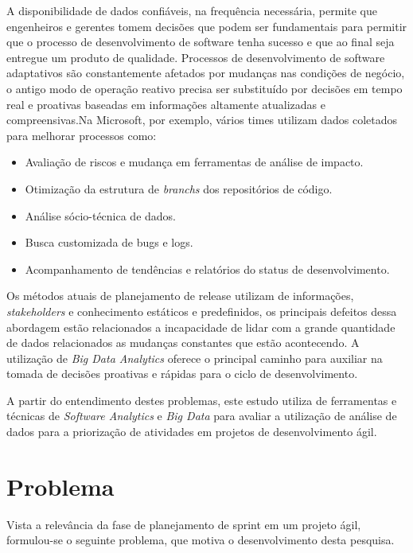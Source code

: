 A disponibilidade de dados confiáveis, na frequência necessária, permite que
engenheiros e gerentes tomem decisões que podem ser fundamentais para permitir
que o processo de desenvolvimento de software tenha sucesso e que ao final seja
entregue um produto de qualidade\cite{codemine}. Processos de desenvolvimento
de software adaptativos são constantemente afetados por mudanças nas condições
de negócio, o antigo modo de operação reativo precisa ser substituído por decisões
em tempo real e proativas baseadas em informações altamente atualizadas e
compreensivas\cite{artAndScience}.Na Microsoft, por exemplo, vários times utilizam
dados coletados para melhorar processos como:

\begin{itemize}
    \item Avaliação de riscos e mudança em ferramentas de análise de impacto.
    \item Otimização da estrutura de \textit{branchs} dos repositórios de código.
    \item Análise sócio-técnica de dados.
    \item Busca customizada de bugs e logs.
    \item Acompanhamento de tendências e relatórios do status de desenvolvimento.
\end{itemize}

Os métodos atuais de planejamento de release utilizam de informações, \textit{stakeholders}
e conhecimento estáticos e predefinidos, os principais defeitos dessa abordagem
estão relacionados a incapacidade de lidar com a grande quantidade de dados
relacionados as mudanças constantes que estão acontecendo. A utilização de
\textit{Big Data Analytics} oferece o principal caminho para auxiliar na tomada
de decisões proativas e rápidas para o ciclo de desenvolvimento\cite{artAndScience}.

A partir do entendimento destes problemas, este estudo utiliza de ferramentas
e técnicas de \textit{Software Analytics} e \textit{Big Data} para avaliar a
utilização de análise de dados para a priorização de atividades em projetos de
desenvolvimento ágil.

\section{Problema}
\label{int:pro}
Vista a relevância da fase de planejamento de sprint em um projeto ágil,
formulou-se o seguinte problema, que motiva o desenvolvimento desta pesquisa.

